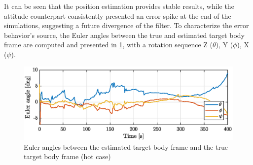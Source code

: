 It can be seen that the position estimation provides stable results, while the attitude counterpart consistently presented an error spike at the end of the simulations, suggesting a future divergence of the filter. To characterize the error behavior's source, the Euler angles between the true and estimated target body frame are computed and presented in \cref{fig:anglesZ}, with a rotation sequence Z ($\theta$), Y ($\phi$), X ($\psi$).\\
\begin{figure}[!h]
    \centering
    \includegraphics[width = \linewidth]{Images/eulangles_corrected.eps}
    \caption[]{Euler angles between the estimated target body frame and the true target body frame (hot case)}
    \label{fig:anglesZ}
\end{figure}
